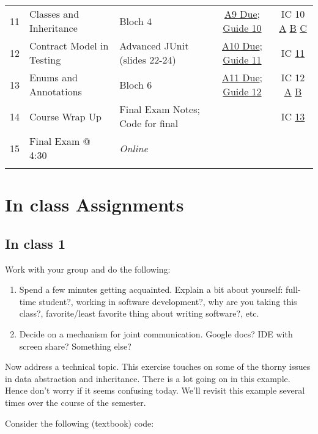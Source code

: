 \documentclass[11pt]{article}
\begin{document}
\begin{center}
\begin{tabular}{rllcc}
11 & Classes and Inheritance & Bloch 4 & \hyperref[sec:orgf89b975]{A9 Due}; \hyperref[sec:orgcc316de]{Guide 10} & IC 10 \hyperref[sec:orgbbdf573]{A} \hyperref[sec:org2036435]{B}  \hyperref[sec:org87161aa]{C}\\
12 & Contract Model in Testing & Advanced JUnit (slides 22-24) & \hyperref[sec:org223d54f]{A10 Due}; \hyperref[sec:orgb293768]{Guide 11} & IC \hyperref[sec:org3711f95]{11}\\
13 & Enums and Annotations & Bloch 6 & \hyperref[sec:orgf91f5c7]{A11 Due}; \hyperref[sec:org822f6d8]{Guide 12} & IC 12 \hyperref[sec:org16fff9b]{A} \hyperref[sec:org0aeee0d]{B}\\
14 & Course Wrap Up & Final Exam Notes; Code for final &  & IC \hyperref[sec:org68e00cb]{13}\\
15 & Final Exam @ 4:30 & \emph{Online} &  & \\
 &  &  &  & \\
\end{tabular}
\end{center}

\section{In class Assignments}
\label{sec:org6b7be15}

\subsection{In class 1}
\label{sec:org748dd31}
Work with your group and do the following:
\begin{enumerate}
\item Spend a few minutes getting acquainted. Explain a bit about yourself: full-time student?, working in software development?, why are you taking this class?, favorite/least favorite thing about writing software?, etc.
\item Decide on a mechanism for joint communication. Google docs? IDE with screen share? Something else?
\end{enumerate}

Now address a technical topic. This exercise touches on some of the thorny issues in data abstraction and inheritance. There is a lot going on in this example. Hence don't worry if it seems confusing today. We'll revisit this example several times over the course of the semester.

Consider the following (textbook) code:
\end{document}
